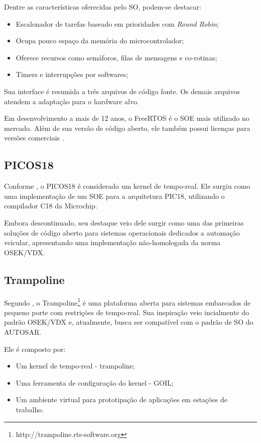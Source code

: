 Dentre as características oferecidas pelo SO, podem-se destacar:
\begin{itemize}
	\item Escalonador de tarefas baseado em prioridades com \emph{Round Robin};
	\item Ocupa pouco espaço da memória do microcontrolador;
	\item Oferece recursos como semáforos, filas de mensagens e co-rotinas;
	\item Timers e interrupções por softwares;
\end{itemize}

Sua interface é resumida a três arquivos de código fonte. Os demais arquivos atendem a adaptação para o hardware alvo.

Em desenvolvimento a mais de 12 anos, o FreeRTOS é o SOE mais utilizado no mercado. Além de sua versão de código aberto, ele também possui licenças para versões comerciais \cite{FreeRTOS:MarketShare}.

\subsection{PICOS18}

Conforme , o PICOS18 é considerado um kernel de tempo-real. Ele surgiu como uma implementação de um SOE para a arquitetura PIC18, utilizando o compilador C18 da Microchip\textsuperscript{\textregistered}.

Embora descontinuado, seu destaque veio dele surgir como uma das primeiras soluções de código aberto para sistemas operacionais dedicados a automação veicular, apresentando uma implementação não-homologada da norma OSEK/VDX.

\subsection{Trampoline}

Segundo , o Trampoline\footnote{http://trampoline.rts-software.org} é uma plataforma aberta para sistemas embarcados de pequeno porte com restrições de tempo-real. Sua inspiração veio incialmente do padrão OSEK/VDX e, atualmente, busca ser compatível com o padrão de SO do AUTOSAR.

Ele é composto por:
\begin{itemize}
	\item Um kernel de tempo-real - trampoline;
	\item Uma ferramenta de configuração do kernel - GOIL;
	\item Um ambiente virtual para prototipação de aplicações em estações de trabalho.
\end{itemize}

